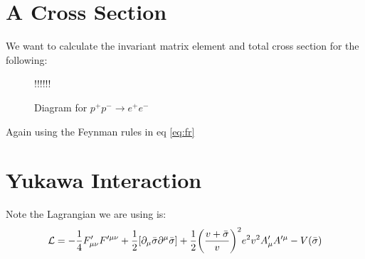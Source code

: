 \documentclass[12pt]{article}
\renewcommand{\L}{\mathcal{L}}
\newcommand{\D}{\partial}
\def\a{!!!} \def\b{!!!}
\def\ifab{\ifx\a\b}
\begin{document}
\section{A Cross Section}
We want to calculate the invariant matrix element and total cross section for the following:
\begin{figure}[H]
  \centering
  \ifab
  \fi
  \caption{Diagram for $p^+p^-\to e^+e^-$}
\end{figure}
Again using the Feynman rules in eq \eqref{eq:fr}

\section{Yukawa Interaction}
Note the Lagrangian we are using is:
\begin{align*}
  \L=-\frac14F'_{\mu\nu}F^{\prime\mu\nu}
  +\frac12\qty[\D_\mu\bar\sigma\D^\mu\bar\sigma]
  +\frac12\qty(\frac{v+\bar\sigma}{v})^2e^2v^2A'_\mu A^{\prime\mu}-V(\bar\sigma)
\end{align*}
\end{document}

